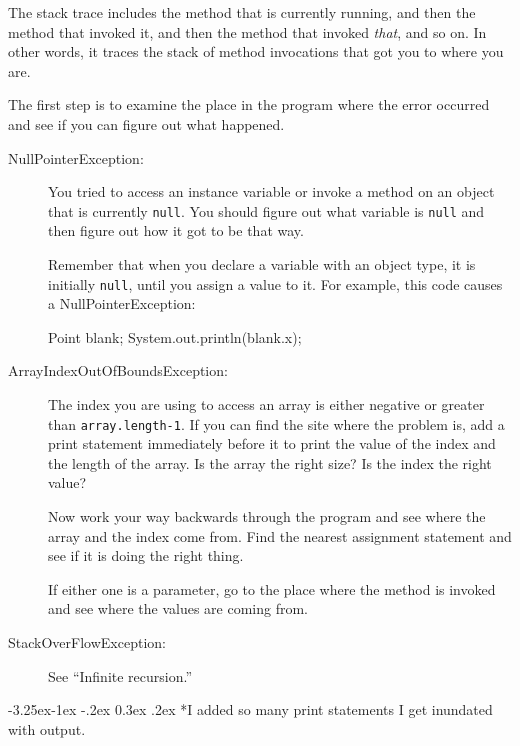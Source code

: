 \documentclass{book}
\makeatletter
\renewcommand\subsection{\@startsection {subsection}{2}{0mm}%
    {-3.25ex\@plus -1ex \@minus -.2ex}%
    {0.3ex \@plus .2ex}%
    {\normalfont\large\bfseries}}
\makeatother
\begin{document}
The stack trace includes the method that is currently running,
and then the method that invoked it, and then the method that
invoked {\em that}, and so on.  In other words, it traces the
stack of method invocations that got you to where you are.

The first step is to examine the place in the program where
the error occurred and see if you can figure out what happened.

\begin{description}

\item[NullPointerException:] You tried to access an instance
variable or invoke a method on an object that is currently
{\tt null}.  You should figure out what variable is {\tt null}
and then figure out how it got to be that way.

Remember that when you declare a variable with an object type,
it is initially {\tt null}, until you assign a value to it.
For example, this code causes a NullPointerException:

\begin{verbatimtab}
Point blank;
System.out.println(blank.x);
\end{verbatimtab}

\item[ArrayIndexOutOfBoundsException:] The index you are using
to access an array is either negative or greater than
{\tt array.length-1}.  If you can find the site where the
problem is, add a print statement immediately before it to
print the value of the index and the length of the array.
Is the array the right size?  Is the index the right value?

Now work your way backwards through the program and see where
the array and the index come from.  Find the nearest assignment
statement and see if it is doing the right thing.

If either one is a parameter, go to the place where the method
is invoked and see where the values are coming from.

\item[StackOverFlowException:] See ``Infinite recursion.''

\end{description}


\subsection*{I added so many print statements I get inundated with
output.}
\end{document}
